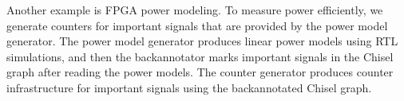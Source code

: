 Another example is FPGA power modeling. To measure power efficiently, we generate counters for important signals that are provided by the power model generator. The power model generator produces linear power models using RTL simulations, and then the backannotator marks important signals in the Chisel graph after reading the power models. The counter generator produces counter infrastructure for important signals using the backannotated Chisel graph.